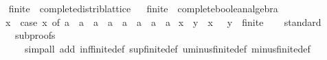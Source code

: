 \begin{isabellebody}
\isadelimproof
\ %
\endisadelimproof
%
\isatagproof
\isacommand{{\isachardot}{\kern0pt}{\isachardot}{\kern0pt}}\isamarkupfalse%
%
\endisatagproof
{\isafoldproof}%
%
\isadelimproof
%
\endisadelimproof
\isanewline
\isanewline
{}\isamarkupfalse%
\ finite{\isacharunderscore}{\kern0pt}{}\ {\isacharcolon}{\kern0pt}{\isacharcolon}{\kern0pt}\ complete{\isacharunderscore}{\kern0pt}distrib{\isacharunderscore}{\kern0pt}lattice%
\isadelimproof
\ %
\endisadelimproof
%
\isatagproof
\isacommand{{\isachardot}{\kern0pt}{\isachardot}{\kern0pt}}\isamarkupfalse%
%
\endisatagproof
{\isafoldproof}%
%
\isadelimproof
%
\endisadelimproof
\isanewline
\isanewline
{}\isamarkupfalse%
\ finite{\isacharunderscore}{\kern0pt}{}\ {\isacharcolon}{\kern0pt}{\isacharcolon}{\kern0pt}\ complete{\isacharunderscore}{\kern0pt}boolean{\isacharunderscore}{\kern0pt}algebra\ \isanewline
{}\isamarkupfalse%
\ {\isachardoublequoteopen}{\isacharminus}{\kern0pt}\ x\ {\isacharequal}{\kern0pt}\ {\isacharparenleft}{\kern0pt}case\ x\ of\ a\ {\isasymRightarrow}\ a\ {\isacharbar}{\kern0pt}\ a\ {\isasymRightarrow}\ a\ {\isacharbar}{\kern0pt}\ a\ {\isasymRightarrow}\ a\ {\isacharbar}{\kern0pt}\ a\ {\isasymRightarrow}\ a\isanewline
{}\isamarkupfalse%
\ {\isachardoublequoteopen}x\ {\isacharminus}{\kern0pt}\ y\ {\isacharequal}{\kern0pt}\ x\ {\isasymsqinter}\ {\isacharminus}{\kern0pt}\ {\isacharparenleft}{\kern0pt}y\ {\isacharcolon}{\kern0pt}{\isacharcolon}{\kern0pt}\ finite{\isacharunderscore}{\kern0pt}{}{\isacharparenright}{\kern0pt}{\isachardoublequoteclose}\isanewline
{}\isamarkupfalse%
\isanewline
%
\isadelimproof
\ \ %
\endisadelimproof
%
\isatagproof
{}\isamarkupfalse%
\ standard\isanewline
\ \ \ \ {\isacharparenleft}{\kern0pt}subproofs\isanewline
\ \ \ \ \ \ {\isacartoucheopen}simp{\isacharunderscore}{\kern0pt}all\ add{\isacharcolon}{\kern0pt}\ inf{\isacharunderscore}{\kern0pt}finite{\isacharunderscore}{\kern0pt}{}{\isacharunderscore}{\kern0pt}def\ sup{\isacharunderscore}{\kern0pt}finite{\isacharunderscore}{\kern0pt}{}{\isacharunderscore}{\kern0pt}def\ uminus{\isacharunderscore}{\kern0pt}finite{\isacharunderscore}{\kern0pt}{}{\isacharunderscore}{\kern0pt}def\ minus{\isacharunderscore}{\kern0pt}finite{\isacharunderscore}{\kern0pt}{}{\isacharunderscore}{\kern0pt}def\ \isanewline

\end{isabellebody}
